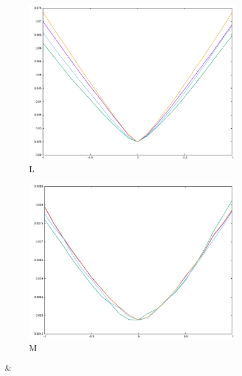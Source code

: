 \begin{figure}[H]
\begin{subfigure}{.33\textwidth}
\end{subfigure}\\
\begin{subfigure}{.33\textwidth}
	\includegraphics[width=\linewidth]{fig/ajherr/t3tr/L_mae.pdf}
	\caption{L}
\end{subfigure}%
\begin{subfigure}{.33\textwidth}
	\includegraphics[width=\linewidth]{fig/ajherr/t3tr/M_mae.pdf}
	\caption{M}
\end{subfigure}&
\begin{subfigure}{.33\textwidth}

\end{subfigure}
\end{figure}
